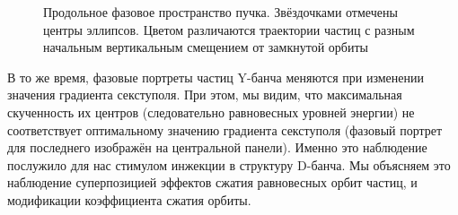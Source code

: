 \begin{figure}[H]
	\centering
	\caption[Продольное фазовое пространство пучка. 
	Звёздочками отмечены центры эллипсов]{Продольное фазовое пространство пучка. 
		Звёздочками отмечены центры эллипсов.\label{fig:long_PS_sext_settings}
	Цветом различаются траектории частиц с разным начальным вертикальным смещением 
	от замкнутой орбиты}
\end{figure}

В то же время, фазовые портреты частиц Y-банча меняются при изменении значения градиента секступоля. 
При этом, мы видим, что максимальная скученность их центров (следовательно равновесных уровней энергии) 
не соответствует оптимальному значению градиента секступоля (фазовый портрет для последнего изображён 
на центральной панели). Именно это наблюдение послужило для нас стимулом инжекции в структуру D-банча. 
Мы объясняем это наблюдение суперпозицией эффектов сжатия равновесных орбит частиц, 
и модификации коэффициента сжатия орбиты.

